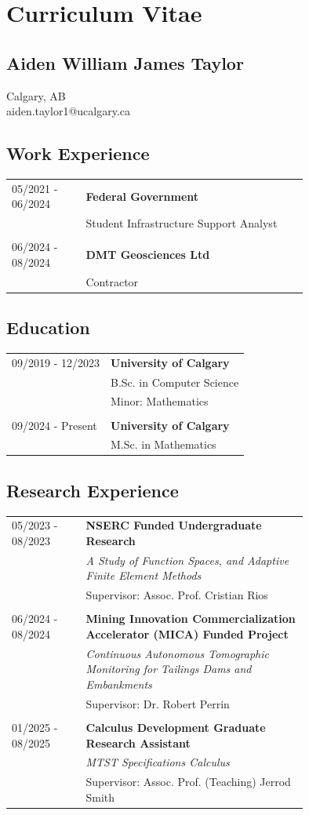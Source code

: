 \documentclass[12pt]{article}
\begin{document}
\section*{Curriculum Vitae}
\subsection*{Aiden William James Taylor}
Calgary, AB \\
aiden.taylor1@ucalgary.ca
\subsection*{Work Experience}
\begin{tabular}{l p{0.75\linewidth}}
05/2021 - 06/2024&\textbf{Federal Government}\\
	            &Student Infrastructure Support Analyst\\
		    &\\
06/2024 - 08/2024&\textbf{DMT Geosciences Ltd}\\
	            &Contractor
\end{tabular}
\subsection*{Education}
\begin{tabular}{l l}
09/2019 - 12/2023&\textbf{University of Calgary}\\
	                & B.Sc. in Computer Science\\
		        & Minor: Mathematics \\
			&\\
09/2024 - Present&\textbf{University of Calgary}\\
	                & M.Sc. in Mathematics
\end{tabular}
\subsection*{Research Experience}
\begin{tabular}{l p{0.75\linewidth}}
05/2023 - 08/2023&\textbf{NSERC Funded Undergraduate Research}\\
		      &\textit{A Study of Function Spaces, and Adaptive Finite Element Methods}\\
		      &Supervisor: Assoc. Prof. Cristian Rios\\
		      &\\
06/2024 - 08/2024&\textbf{Mining Innovation Commercialization Accelerator (MICA) Funded Project}\\
		      &\textit{Continuous Autonomous Tomographic Monitoring for Tailings Dams and Embankments}\\
		      &Supervisor: Dr. Robert Perrin \\
		      &\\
01/2025 - 08/2025&\textbf{Calculus Development Graduate Research Assistant} \\
		      &\textit{MTST Specifications Calculus}\\
		      &Supervisor: Assoc. Prof. (Teaching) Jerrod Smith
\end{tabular}
\end{document}
